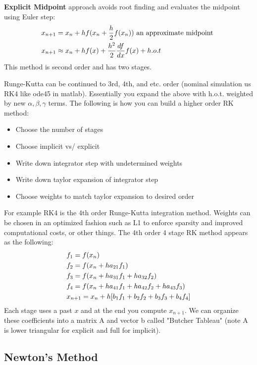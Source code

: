 \documentclass{article}
\begin{document}
\textbf{Explicit Midpoint} approach avoids root finding and evaluates the midpoint using Euler step:
\begin{align}
    & x_{n+1} = x_n + hf(x_n + \frac{h}{2}f(x_n)) \text{ an approximate midpoint } \notag \\
    & x_{n+1} \approx x_n + hf(x) + \frac{h^2}{2}\frac{df}{dx}f(x) + h.o.t
\end{align}
This method is second order and has two stages.

Runge-Kutta can be continued to 3rd, 4th, and etc. order (nominal simulation us RK4 like ode45 in matlab). Essentially you expand the above with h.o.t. weighted by new $\alpha, \beta, \gamma$ terms. The following is how you can build a higher order RK method:
\begin{itemize}
    \item Choose the number of stages
    \item Choose implicit vs/ explicit
    \item Write down integrator step with undetermined weights
    \item Write down taylor expansion of integrator step
    \item Choose weights to match taylor expansion to desired order
\end{itemize}
For example RK4 is the 4th order Runge-Kutta integration method. Weights can be chosen in an optimized fashion such as L1 to enforce sparsity and improved computational costs, or other things. The 4th order 4 stage RK method appears as the following:
\begin{align}
    & f_1 = f(x_n) \notag \\
    & f_2 = f(x_n + h a_{21}f_1) \notag \\
    & f_3 = f(x_n + h a_{31}f_1 + h a_{32}f_2) \notag \\
    & f_4 = f(x_n + h a_{41}f_1 + h a_{42}f_2 + h a_{43}f_3) \notag \\
    & x_{n+1} = x_n + h [b_1 f_1 + b_2 f_2 + b_3 f_3 + b_4 f_4] 
\end{align}
Each stage uses a past $x$ and at the end you compute $x_{n+1}$. We can organize these coefficients into a matrix A and vector b called "Butcher Tableau" (note A is lower triangular for explicit and full for implicit).

\subsection{Newton's Method}
\end{document}
